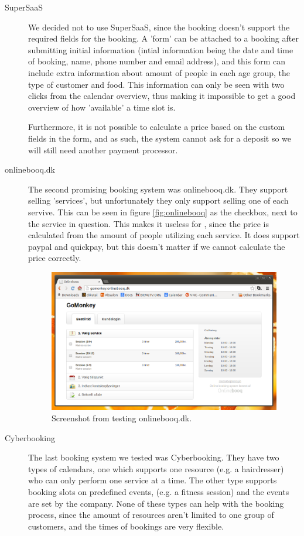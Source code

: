 \begin{description}
\item[SuperSaaS]
We decided not to use SuperSaaS, since the booking doesn’t support the required 
fields for the booking. A 'form' can be attached to a booking after submitting 
initial information (intial information being the date and time of booking, 
name, phone number and email address), and this 
form can include extra information about amount of people in each age group, the
type of customer and food. This information can only be seen with two clicks 
from the calendar overview, thus making it impossible to get a good overview of 
how 'available' a time slot is.

Furthermore, it is not possible to calculate a price based on the custom fields 
in the form, and as such, the system cannot ask for a deposit so we will still 
need another payment processor.

\item[onlinebooq.dk]
The second promising booking system was onlinebooq.dk. They support selling 
'services', but unfortunately they only support selling one of each servive.
This can be seen in figure \autoref{fig:onlinebooq} as the checkbox, next to the 
service in question. This makes it useless for \gomonkey, since the price is 
calculated from the amount of people utilizing each service. It does support 
paypal and quickpay, but this doesn't matter if we cannot calculate the price 
correctly.

\begin{figure}[htbp]
    \centering
        \includegraphics[width=.8\textwidth]{figures/onlinebooq.png}
	    \caption{Screenshot from testing onlinebooq.dk.}
        \label{fig:onlinebooq}
\end{figure}
		

\item[Cyberbooking]
The last booking system we tested was Cyberbooking. They have two types of 
calendars, one which supports one resource (e.g. a hairdresser) who can only
perform one service at a time. The other type supports booking slots on 
predefined events, (e.g. a fitness session) and the events are set by the 
company. None of these types can help \gomonkey{} with the booking process,
since the amount of resources aren't limited to one group of customers, and 
the times of bookings are very flexible.
\end{description}

